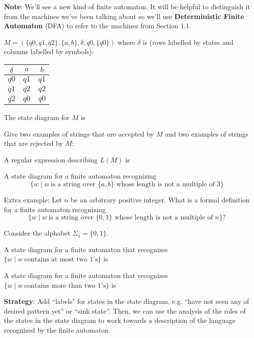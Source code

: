 \documentclass[12pt, oneside]{article}
\begin{document}
{\bf Note}: We'll see a new kind of finite automaton. It will be helpful to distinguish it from the
machines we've been talking about so we'll use {\bf Deterministic Finite Automaton} (DFA) to refer to the machines 
from Section 1.1.

$M = ( \{ q0, q1, q2\}, \{a,b\}, \delta, q0, \{q0\} )$ 
where $\delta$ is  (rows labelled by states
and columns labelled by symbols):
\begin{center}
\begin{tabular}{c|cc}
$\delta$ & $a$ & $b$ \\
\hline
$q0$ & $q1$ & $q1$ \\
$q1$ & $q2$ & $q2$ \\
$q2$ & $q0$ & $q0$ \\
\end{tabular}
\end{center}

The state diagram for $M$ is 

\vfill


Give two examples of strings that are accepted by $M$ and two examples of strings that are rejected by $M$:

\vfill


A regular expression describing $L(M)$ is


\vfill 

A state diagram for a finite automaton recognizing
$$\{w \mid w~\text{is a string over $\{a,b\}$ whose length is not a multiple of $3$} \}$$

\vfill

Extra example: Let $n$ be an arbitrary positive integer. What is a formal definition for a finite automaton recognizing
\[
\{w \mid w~\text{is a string over $\{0,1\}$ whose length is not a multiple of $n$} \}?
\]

\newpage

Consider the alphabet $\Sigma_1 = \{0,1\}$.

A state diagram for a finite automaton that recognizes $\{w \mid w~\text{contains at most two $1$'s} \}$ is

\vfill
A state diagram for a finite automaton that recognizes $\{w \mid w~\text{contains more than two $1$'s} \}$ is

\vfill

\textbf{Strategy}: Add ``labels" for states in the state diagram, 
e.g. ``have not seen any of desired pattern yet'' or
``sink state''. Then, we can use the analysis of the roles of the states in the 
state diagram to work towards a description of the language recognized
by the finite automaton.
\end{document}
